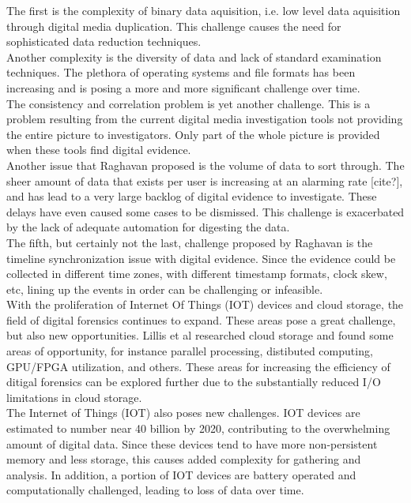 \documentclass[12pt]{article}
\begin{document}
The first is the complexity of binary data aquisition, i.e. low level data aquisition through digital media
duplication.  This challenge causes the need for sophisticated data reduction techniques.\\

Another complexity is the diversity of data and lack of standard examination techniques.  The plethora of
operating systems and file formats has been increasing and is posing a more and more significant challenge
over time.\\

The consistency and correlation problem is yet another challenge.  This is a problem resulting from the current
digital media investigation tools not providing the entire picture to investigators.  Only part of the whole
picture is provided when these tools find digital evidence.\\

Another issue that Raghavan\cite{raghavan2013digital} proposed is the volume of data to sort through.  The sheer
amount of data that exists per user is increasing at an alarming rate [cite?], and has lead to a very large
backlog of digital evidence to investigate.  These delays have even caused some cases to be dismissed.  This
challenge is exacerbated by the lack of adequate automation for digesting the data.\\

The fifth, but certainly not the last, challenge proposed by Raghavan\cite{raghavan2013digital} is the timeline
synchronization issue with digital evidence.  Since the evidence could be collected in different time zones, 
with different timestamp formats, clock skew, etc, lining up the events in order can be challenging or
infeasible.\\

With the proliferation of Internet Of Things (IOT) devices and cloud storage, the field of digital forensics
continues to expand.  These areas pose a great challenge, but also new opportunities.  Lillis et
al\cite{lillis2016current} researched cloud storage and found some areas of opportunity, for instance parallel
processing, distibuted computing, GPU/FPGA utilization, and others.  These areas for increasing the efficiency
of ditigal forensics can be explored further due to the substantially reduced I/O limitations in cloud storage.\\

The Internet of Things (IOT) also poses new challenges.  IOT devices are estimated to number near 40 billion by
2020, contributing to the overwhelming amount of digital data.  Since these devices tend to have more 
non-persistent memory and less storage, this causes added complexity for gathering and analysis.  In addition,
a portion of IOT devices are battery operated and computationally challenged, leading to loss of data over
time.\\
\end{document}
